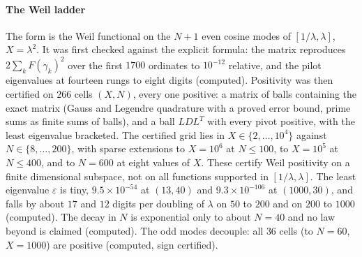 \paragraph{The Weil ladder} The form is the Weil functional on the $N+1$ even cosine modes of $[1/\lambda,\lambda]$, $X=\lambda^2$. It was first checked against the explicit formula: the matrix reproduces $2\sum_kF(\gamma_k)^2$ over the first $1700$ ordinates to $10^{-12}$ relative, and the pilot eigenvalues at fourteen rungs to eight digits (computed). Positivity was then certified on $266$ cells $(X,N)$, every one positive: a matrix of balls containing the exact matrix (Gauss and Legendre quadrature with a proved error bound, prime sums as finite sums of balls), and a ball $LDL^T$ with every pivot positive, with the least eigenvalue bracketed. The certified grid lies in $X\in\{2,\dots,10^4\}$ against $N\in\{8,\dots,200\}$, with sparse extensions to $X=10^6$ at $N\le100$, to $X=10^5$ at $N\le400$, and to $N=600$ at eight values of $X$. These certify Weil positivity on a finite dimensional subspace, not on all functions supported in $[1/\lambda,\lambda]$. The least eigenvalue $\varepsilon$ is tiny, $9.5\times10^{-54}$ at $(13,40)$ and $9.3\times10^{-106}$ at $(1000,30)$, and falls by about $17$ and $12$ digits per doubling of $\lambda$ on $50$ to $200$ and on $200$ to $1000$ (computed). The decay in $N$ is exponential only to about $N=40$ and no law beyond is claimed (computed).  The odd modes decouple: all $36$ cells (to $N=60$, $X=1000$) are positive (computed, sign certified).

